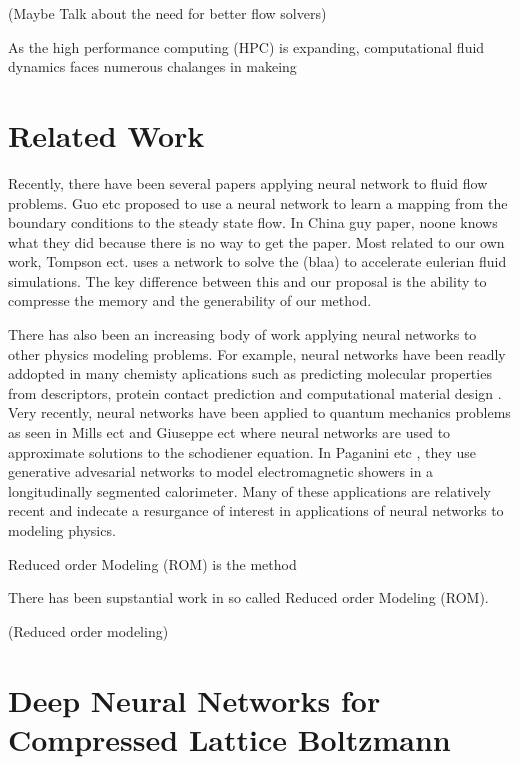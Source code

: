 \documentclass{article}
\begin{document}
(Maybe Talk about the need for better flow solvers)

As the high performance computing (HPC) is expanding, computational fluid dynamics faces numerous chalanges in makeing 


\section{Related Work}

Recently, there have been several papers applying neural network to fluid flow problems. Guo etc \cite{guo2016convolutional} proposed to use a neural network to learn a mapping from the boundary conditions to the steady state flow. In China guy paper, noone knows what they did because there is no way to get the paper. Most related to our own work, Tompson ect. \cite{tompson2016accelerating} uses a network to solve the (blaa) to accelerate eulerian fluid simulations. The key difference between this and our proposal is the ability to compresse the memory and the generability of our method.

There has also been an increasing body of work applying neural networks to other physics modeling problems. For example, neural networks have been readly addopted in many chemisty aplications such as predicting molecular properties from descriptors, protein contact prediction and computational material design \cite{goh2017deep}. Very recently, neural networks have been applied to quantum mechanics problems as seen in Mills ect \cite{mills2017deep} and Giuseppe ect \cite{carleo2017solving} where neural networks are used to approximate solutions to the schodiener equation. In Paganini etc \cite{2017arXiv170502355P}, they use generative advesarial networks \cite{goodfellow2014generative} to model electromagnetic showers in a longitudinally segmented calorimeter. Many of these applications are relatively recent and indecate a resurgance of interest in applications of neural networks to modeling physics.

Reduced order Modeling (ROM) is the method 

There has been supstantial work in so called Reduced order Modeling (ROM).

(Reduced order modeling)

\section{Deep Neural Networks for Compressed Lattice Boltzmann}
\end{document}
